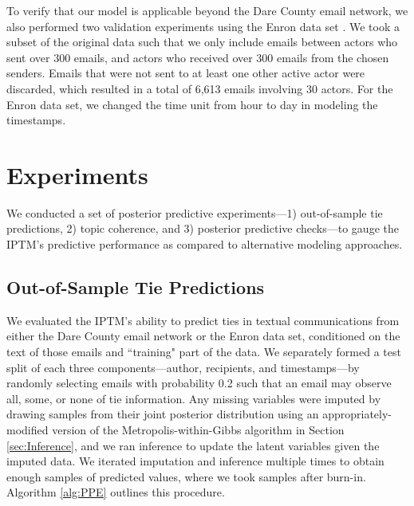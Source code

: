 \documentclass{article}
\begin{document}
To verify that our model is applicable beyond the Dare County email network, we also performed two validation experiments using the Enron data set \cite{klimt2004introducing}. We took a subset of the original data such that we only include emails between actors who sent over 300 emails, and actors who received over 300 emails from the chosen senders. Emails that were not sent to at least one other active actor were discarded, which resulted in a total of 6,613 emails involving 30 actors. For the Enron data set, we changed the time unit from hour to day in modeling the timestamps.

\section{Experiments}\label{sec:Experiments}
We conducted a set of posterior predictive experiments---1) out-of-sample tie predictions, 2) topic coherence, and 3) posterior predictive checks---to gauge the IPTM's predictive performance as compared to alternative modeling approaches.

\subsection{Out-of-Sample Tie Predictions}\label{subsec:Tie Prediction}
We evaluated the IPTM's ability to predict ties in textual communications from either the Dare County email network or the Enron data set, conditioned on the text of those emails and ``training" part of the data. We separately formed a test split of each three components---author, recipients, and timestamps---by randomly selecting emails with probability 0.2 such that an email may observe all, some, or none of tie information. Any missing variables were imputed by drawing samples from their joint posterior distribution using an appropriately-modified version of the Metropolis-within-Gibbs algorithm in Section \ref{sec:Inference}, and we ran inference to update the latent variables  given the imputed data. We iterated imputation and inference multiple times to obtain enough samples of predicted values, where we took samples after burn-in. Algorithm \ref{alg:PPE} outlines this procedure.
\end{document}
